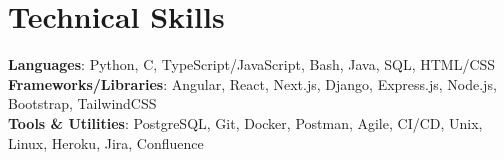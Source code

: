 \documentclass[letterpaper,11pt]{article}
\makeatletter
\newcommand{\resumeProjectHeading}[2]{
    \item
    \begin{tabular*}{0.97\textwidth}{l@{\extracolsep{\fill}}r}
      \small#1 & #2 \\
    \end{tabular*}\vspace{-7pt}
}
\newcommand{\resumeSubHeadingListStart}{\begin{itemize}[leftmargin=0.15in, label={}]}
\newcommand{\resumeSubHeadingListEnd}{\end{itemize}}
\makeatother
\begin{document}
\section{Technical Skills}
\begin{itemize}[leftmargin=0.15in, label={}]
	\small{\item{
			\textbf{Languages}{: Python, C, TypeScript/JavaScript, Bash, Java, SQL, HTML/CSS} \\
			\textbf{Frameworks/Libraries}{: Angular, React, Next.js, Django, Express.js, Node.js, Bootstrap, TailwindCSS} \\
			\textbf{Tools \& Utilities}{: PostgreSQL, Git, Docker, Postman, Agile, CI/CD,  Unix, Linux, Heroku, Jira, Confluence} \\
	}}
\end{itemize}

\end{document}
